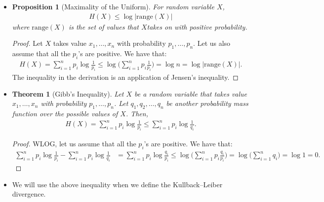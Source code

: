 \documentclass[10pt]{article}
\newtheorem{theorem}[lemma]{Theorem}
\newtheorem{proposition}[lemma]{Proposition}
\begin{document}
\begin{itemize}
  	\item \begin{proposition}[Maximality of the Uniform]
  		For random variable $X$,
  		\begin{align*}
  			H(X) \leq \log | \mathrm{range}(X) |
  		\end{align*}
  		where $\mathrm{range}(X)$ is the set of values that $X$takes on with positive probability.
  	\end{proposition}

  	\begin{proof}
  		Let $X$ takes value $x_1, \dotsc, x_n$ with probability $p_1, \dotsc, p_n$. Let us also assume that all the $p_i$'s are positive. We have that:
  		\begin{align*}
  			H(X) 
  			= \sum_{i=1}^n p_i \log \frac{1}{p_i}
  			\leq \log\bigg( \sum_{i=1}^n p_i \frac{1}{p_i} \bigg)
  			= \log n = \log |\mathrm{range}(X)|.
  		\end{align*}
  		The inequality in the derivation is an application of Jensen's inequality.
  	\end{proof}

  	\item \begin{theorem}[Gibb's Inequality]
  		Let $X$ be a random variable that takes value $x_1, \dotsc, x_n$ with probability $p_1, \dotsc, p_n$. Let $q_1, q_2, \dotsc, q_n$ be another probability mass function over the possible values of $X$. Then,
  		\begin{align*}
  			H(X) = \sum_{i=1}^n p_i \log \frac{1}{p_i} \leq \sum_{i=1}^n p_i \log \frac{1}{q_i}.
  		\end{align*}
  	\end{theorem}

  	\begin{proof}
  		WLOG, let us assume that all the $p_i$'s are positive. We have that:
  		\begin{align*}
  			\sum_{i=1}^n p_i \log \frac{1}{p_i} - \sum_{i=1}^n p_i \log \frac{1}{q_i}
  			&= \sum_{i=1}^n p_i \log \frac{q_i}{p_i}
  			\leq \log \bigg( \sum_{i=1}^n p_i \frac{q_i}{p_i} \bigg)
  			= \log \bigg( \sum_{i=1}^n q_i \bigg)
  			= \log 1 = 0.
  		\end{align*}
  	\end{proof}

  	\item We will use the above inequality when we define the Kullback--Leiber divergence.  	
  \end{itemize}
\end{document}

